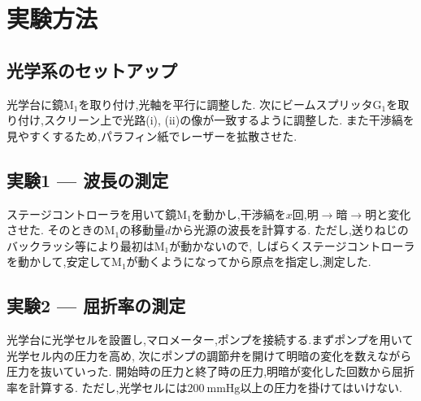 \section{実験方法}
\subsection{光学系のセットアップ}
光学台に鏡$\mathrm{M_1}$を取り付け,光軸を平行に調整した.
次にビームスプリッタ$\mathrm{G_1}$を取り付け,スクリーン上で光路(i), (ii)の像が一致するように調整した.
また干渉縞を見やすくするため,パラフィン紙でレーザーを拡散させた.
\subsection{実験1 --- 波長の測定}
ステージコントローラを用いて鏡$\mathrm{M_1}$を動かし,干渉縞を$x$回,明$\rightarrow$暗$\rightarrow$明と変化させた.
そのときの$\mathrm{M_1}$の移動量$d$から光源の波長を計算する.
ただし,送りねじのバックラッシ等により最初は$\mathrm{M_1}$が動かないので,
しばらくステージコントローラを動かして,安定して$\mathrm{M_1}$が動くようになってから原点を指定し,測定した.
\subsection{実験2 --- 屈折率の測定}
光学台に光学セルを設置し,マロメーター,ポンプを接続する.まずポンプを用いて光学セル内の圧力を高め,
次にポンプの調節弁を開けて明暗の変化を数えながら圧力を抜いていった.
開始時の圧力と終了時の圧力,明暗が変化した回数から屈折率を計算する.
ただし,光学セルには$200~\si{\mmHg}$以上の圧力を掛けてはいけない.